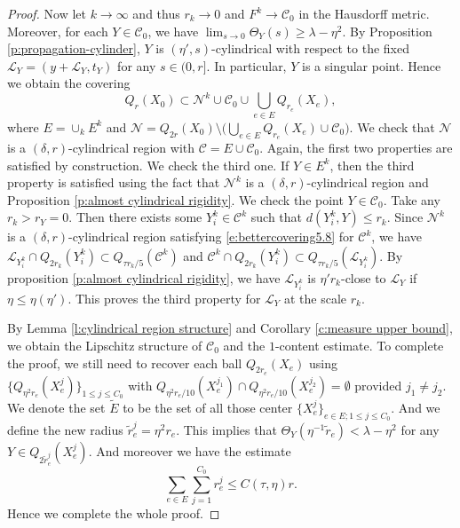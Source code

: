 \documentclass[11pt,reqno]{amsart}
\numberwithin{equation}{section}
\newcommand{\cC}{\mathcal{C}}
\newcommand{\cL}{\mathcal{L}}
\newcommand{\cN}{\mathcal{N}}
\theoremstyle{definition}
\theoremstyle{remark}
\theoremstyle{remark}
\theoremstyle{remark}
\theoremstyle{remark}\newtheorem{conjecture}[equation]{Conjecture}
\theoremstyle{remark}\newtheorem{question}[equation]{Question}
\begin{document}
\begin{proof}
Now let $k \to \infty$ and thus $r_k \to 0$ and $F^k \to \cC_0$ in the Hausdorff metric. Moreover, for each $Y \in \cC_0$, we have $\lim_{s\to 0} \Theta_Y(s) \ge \lambda- \eta^2$. By Proposition \ref{p:propagation-cylinder}, $Y$ is $(\eta',s)$-cylindrical with respect to the fixed $\cL_Y = (y + \cL_Y, t_Y)$ for any $s\in(0, r]$. In particular, $Y$ is a singular point.  Hence we obtain the covering
\begin{equation*}
    Q_r(X_0) \subset \cN^k \cup \cC_0 \cup \bigcup_{e\in E}Q_{r_e}(X_e),
\end{equation*}
where $E = \cup_k E^k$ and $\cN = Q_{2r}(X_0) \setminus \big( \bigcup_{e\in E}Q_{r_e}(X_e) \cup \cC_0)$. We check that $\cN$ is a $(\delta,r)$-cylindrical region with $\cC = E \cup \cC_0$. Again, the first two properties are satisfied by construction. We check the third one. If $Y\in E^k$, then the third property is satisfied using the fact that $\cN^k$ is a $(\delta,r)$-cylindrical region and Proposition \ref{p:almost cylindrical rigidity}. We check the point $Y \in \cC_0$. Take any $r_k>r_Y=0$. Then there exists some $Y^k_i \in \cC^k$ such that $d(Y^k_i,Y) \le r_k$. Since $\cN^k$ is a $(\delta,r)$-cylindrical region satisfying \eqref{e:bettercovering5.8} for $\cC^k$, we have $\cL_{Y^k_i}\cap Q_{2r_k}(Y^k_i) \subset Q_{\tau r_k/5}(\cC^k)$ and $\cC^k \cap Q_{2r_k}(Y^k_i) \subset Q_{\tau r_k/5}(\cL_{Y^k_i})$. By proposition \ref{p:almost cylindrical rigidity}, we have $\cL_{Y^k_i}$ is $\eta'r_k$-close to $\cL_Y$ if $\eta\le\eta(\eta')$. This proves the third property for $\cL_{Y}$ at the scale $r_k$.

By  Lemma \ref{l:cylindrical region structure} and Corollary \ref{c:measure upper bound}, we obtain the Lipschitz structure of $\cC_0$ and the $1$-content estimate. To complete the proof, we still need to recover each ball $Q_{2r_e}(X_e)$ using $\{Q_{\eta^2 r_e}(X_e^j)\}_{1 \le j \le C_0}$ with $Q_{\eta^2 r_e/10}(X_e^{j_1}) \cap Q_{\eta^2 r_e /10}(X_e^{j_2}) = \emptyset$ provided $j_1 \neq j_2$. We denote the set $\tilde{E}$ to be the set of all those center $\{X_e^j\}_{e\in E; 1\le j \le C_0}$. And we define the new radius $\tilde{r}_e^j = \eta^2 r_e$. This implies that $\Theta_Y(\eta^{-1} \tilde{r}_e) < \lambda - \eta^2$ for any $Y \in Q_{2 \tilde{r}^j_e}(X^j_e)$. And moreover we have the estimate
\begin{equation*}
    \sum_{e\in E} \sum_{j=1}^{C_0}  r_e^j \le C(\tau,\eta)r.
\end{equation*}
Hence we complete the whole proof.
\end{proof}
\end{document}
